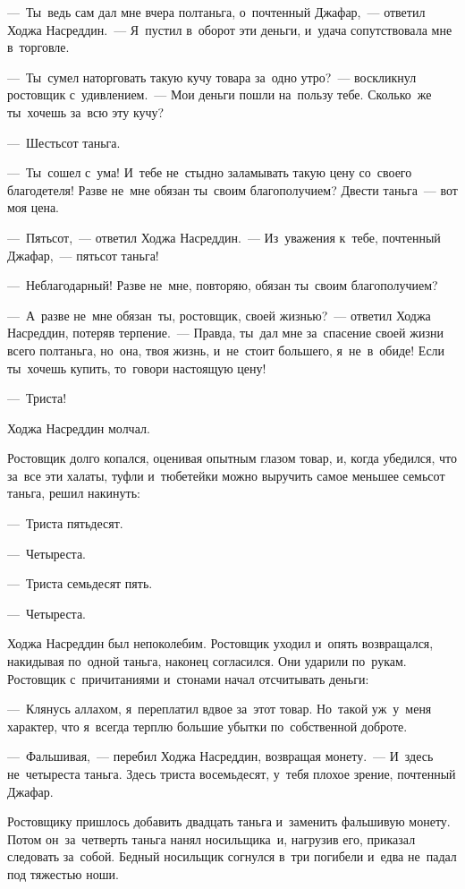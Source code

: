 \documentclass[12pt,a4paper]{book}
\begin{document}
—~Ты~ведь сам дал мне вчера полтаньга, о~почтенный Джафар,~— ответил Ходжа Насреддин.~— Я~пустил в~оборот эти деньги, и~удача сопутствовала мне в~торговле.

—~Ты~сумел наторговать такую кучу товара за~одно утро?~— воскликнул ростовщик с~удивлением.~— Мои деньги пошли на~пользу тебе. Сколько~же ты~хочешь за~всю эту кучу?

—~Шестьсот таньга.

—~Ты~сошел с~ума! И~тебе не~стыдно заламывать такую цену со~своего благодетеля! Разве не~мне обязан ты~своим благополучием? Двести таньга~— вот моя цена.

—~Пятьсот,~— ответил Ходжа Насреддин.~— Из~уважения к~тебе, почтенный Джафар,~— пятьсот таньга!

—~Неблагодарный! Разве не~мне, повторяю, обязан ты~своим благополучием?

—~А~разве не~мне обязан~ты, ростовщик, своей жизнью?~— ответил Ходжа Насреддин, потеряв терпение.~— Правда, ты~дал мне за~спасение своей жизни всего полтаньга, но~она, твоя жизнь, и~не~стоит большего, я~не~в~обиде! Если ты~хочешь купить, то~говори настоящую цену!

—~Триста!

Ходжа Насреддин молчал.

Ростовщик долго копался, оценивая опытным глазом товар, и, когда убедился, что за~все эти халаты, туфли и~тюбетейки можно выручить самое меньшее семьсот таньга, решил накинуть:

—~Триста пятьдесят.

—~Четыреста.

—~Триста семьдесят пять.

—~Четыреста.

Ходжа Насреддин был непоколебим. Ростовщик уходил и~опять возвращался, накидывая по~одной таньга, наконец согласился. Они ударили по~рукам. Ростовщик с~причитаниями и~стонами начал отсчитывать деньги:

—~Клянусь аллахом, я~переплатил вдвое за~этот товар. Но~такой уж~у~меня характер, что я~всегда терплю большие убытки по~собственной доброте.

—~Фальшивая,~— перебил Ходжа Насреддин, возвращая монету.~— И~здесь не~четыреста таньга. Здесь триста восемьдесят, у~тебя плохое зрение, почтенный Джафар.

Ростовщику пришлось добавить двадцать таньга и~заменить фальшивую монету. Потом он~за~четверть таньга нанял носильщика~и, нагрузив его, приказал следовать за~собой. Бедный носильщик согнулся в~три погибели и~едва не~падал под тяжестью ноши.
\end{document}
